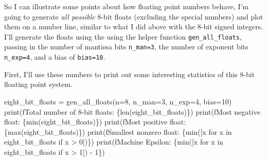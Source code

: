 \documentclass[
  letterpaper,
  DIV=11,
  numbers=noendperiod]{scrreprt}
\newenvironment{Shaded}{\begin{snugshade}}{\end{snugshade}}
\newcommand{\BuiltInTok}[1]{\textcolor[rgb]{0.00,0.23,0.31}{#1}}
\newcommand{\ControlFlowTok}[1]{\textcolor[rgb]{0.00,0.23,0.31}{#1}}
\newcommand{\DecValTok}[1]{\textcolor[rgb]{0.68,0.00,0.00}{#1}}
\newcommand{\KeywordTok}[1]{\textcolor[rgb]{0.00,0.23,0.31}{#1}}
\newcommand{\NormalTok}[1]{\textcolor[rgb]{0.00,0.23,0.31}{#1}}
\newcommand{\OperatorTok}[1]{\textcolor[rgb]{0.37,0.37,0.37}{#1}}
\newcommand{\SpecialCharTok}[1]{\textcolor[rgb]{0.37,0.37,0.37}{#1}}
\newcommand{\SpecialStringTok}[1]{\textcolor[rgb]{0.13,0.47,0.30}{#1}}
\begin{document}
So I can illustrate some points about how floating point numbers behave,
I'm going to generate \emph{all possible} \(8\)-bit floats (excluding
the special numbers) and plot them on a number line, similar to what I
did above with the \(8\)-bit signed integers. I'll generate the floats
using the using the helper function \texttt{gen\_all\_floats}, passing
in the number of mantissa bits \texttt{n\_man=3}, the number of exponent
bits \texttt{n\_exp=4}, and a bias of \texttt{bias=10}.

First, I'll use these numbers to print out some interesting statistics
of this 8-bit floating point system.

\begin{Shaded}
\begin{Highlighting}[]
\NormalTok{eight\_bit\_floats }\OperatorTok{=}\NormalTok{ gen\_all\_floats(n}\OperatorTok{=}\DecValTok{8}\NormalTok{, n\_man}\OperatorTok{=}\DecValTok{3}\NormalTok{, n\_exp}\OperatorTok{=}\DecValTok{4}\NormalTok{, bias}\OperatorTok{=}\DecValTok{10}\NormalTok{)}
\BuiltInTok{print}\NormalTok{(}\SpecialStringTok{f\textquotesingle{}Total number of 8{-}bit floats: }\SpecialCharTok{\{}\BuiltInTok{len}\NormalTok{(eight\_bit\_floats)}\SpecialCharTok{\}}\SpecialStringTok{\textquotesingle{}}\NormalTok{)}
\BuiltInTok{print}\NormalTok{(}\SpecialStringTok{f\textquotesingle{}Most negative float: }\SpecialCharTok{\{}\BuiltInTok{min}\NormalTok{(eight\_bit\_floats)}\SpecialCharTok{\}}\SpecialStringTok{\textquotesingle{}}\NormalTok{)}
\BuiltInTok{print}\NormalTok{(}\SpecialStringTok{f\textquotesingle{}Most positive float: }\SpecialCharTok{\{}\BuiltInTok{max}\NormalTok{(eight\_bit\_floats)}\SpecialCharTok{\}}\SpecialStringTok{\textquotesingle{}}\NormalTok{)}
\BuiltInTok{print}\NormalTok{(}\SpecialStringTok{f\textquotesingle{}Smallest nonzero float: }\SpecialCharTok{\{}\BuiltInTok{min}\NormalTok{([x }\ControlFlowTok{for}\NormalTok{ x }\KeywordTok{in}\NormalTok{ eight\_bit\_floats }\ControlFlowTok{if}\NormalTok{ x }\OperatorTok{\textgreater{}} \DecValTok{0}\NormalTok{])}\SpecialCharTok{\}}\SpecialStringTok{\textquotesingle{}}\NormalTok{)}
\BuiltInTok{print}\NormalTok{(}\SpecialStringTok{f\textquotesingle{}Machine Epsilon: }\SpecialCharTok{\{}\BuiltInTok{min}\NormalTok{([x }\ControlFlowTok{for}\NormalTok{ x }\KeywordTok{in}\NormalTok{ eight\_bit\_floats }\ControlFlowTok{if}\NormalTok{ x }\OperatorTok{\textgreater{}} \DecValTok{1}\NormalTok{]) }\OperatorTok{{-}} \DecValTok{1}\SpecialCharTok{\}}\SpecialStringTok{\textquotesingle{}}\NormalTok{)}
\end{Highlighting}
\end{Shaded}
\end{document}
